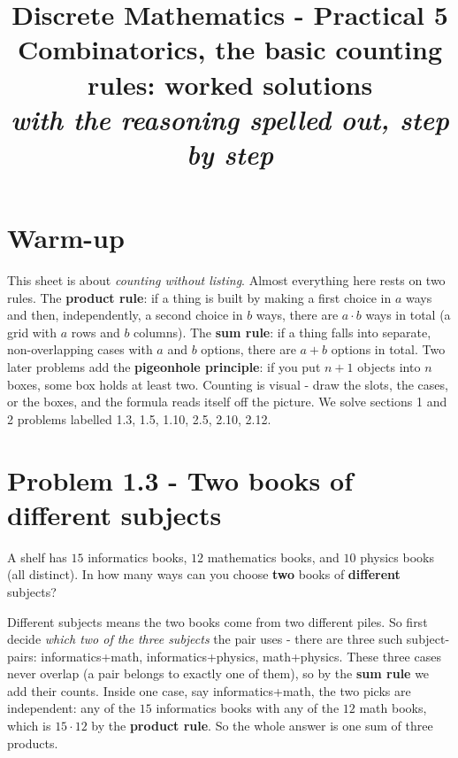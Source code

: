 \documentclass[11pt,a4paper]{article}
\title{\vspace{-1.2cm}\textbf{Discrete Mathematics - Practical 5}\\[2pt]
\large Combinatorics, the basic counting rules: worked solutions\\[2pt]
\normalsize\itshape with the reasoning spelled out, step by step}
\author{}
\date{}
\begin{document}
\maketitle
\vspace{-1.0cm}

\section*{Warm-up}
This sheet is about \emph{counting without listing}. Almost everything here rests on two rules.
The \textbf{product rule}: if a thing is built by making a first choice in $a$ ways and then,
independently, a second choice in $b$ ways, there are $a\cdot b$ ways in total (a grid with $a$
rows and $b$ columns). The \textbf{sum rule}: if a thing falls into separate, non-overlapping
cases with $a$ and $b$ options, there are $a+b$ options in total. Two later problems add the
\textbf{pigeonhole principle}: if you put $n+1$ objects into $n$ boxes, some box holds at least
two. Counting is visual - draw the slots, the cases, or the boxes, and the formula reads itself
off the picture. We solve sections 1 and 2 problems labelled 1.3, 1.5, 1.10, 2.5, 2.10, 2.12.

\section*{Problem 1.3 - Two books of different subjects}

\begin{problembox}[1.3]
A shelf has $15$ informatics books, $12$ mathematics books, and $10$ physics books (all
distinct). In how many ways can you choose \textbf{two} books of \textbf{different} subjects?
\end{problembox}

\begin{ideabox}
\textquotedbl{}Different subjects\textquotedbl{} means the two books come from two different
piles. So first decide \emph{which two of the three subjects} the pair uses - there are three such
subject-pairs: informatics+math, informatics+physics, math+physics. These three cases never
overlap (a pair belongs to exactly one of them), so by the \textbf{sum rule} we add their counts.
Inside one case, say informatics+math, the two picks are independent: any of the $15$ informatics
books with any of the $12$ math books, which is $15\cdot 12$ by the \textbf{product rule}. So the
whole answer is one sum of three products.
\end{ideabox}
\end{document}
